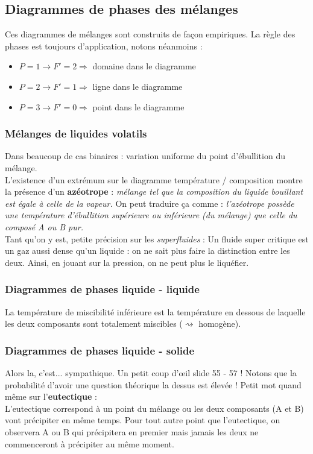 \documentclass[12pt, a4paper]{article}
\begin{document}
\subsection{Diagrammes de phases des mélanges}
Ces diagrammes de mélanges sont construits de façon empiriques. La règle des phases est toujours d'application, notons néanmoins : 
\begin{itemize}
\item $P = 1 \rightarrow F' = 2 \Rightarrow$ domaine dans le diagramme
\item $P = 2 \rightarrow F' = 1 \Rightarrow$ ligne dans le diagramme
\item $P = 3 \rightarrow F' = 0 \Rightarrow$ point dans le diagramme
\end{itemize}
\subsubsection{Mélanges de liquides volatils}
Dans beaucoup de cas binaires : variation uniforme du point d'ébullition du mélange.\\
L'existence d'un extrémum sur le diagramme température / composition montre la présence d'un \textbf{azéotrope} : \textit{mélange tel que la composition du liquide bouillant est égale à celle de la vapeur.} On peut traduire ça comme : \textit{l'azéotrope possède une température d'ébullition supérieure ou inférieure (du mélange) que celle du composé A ou B pur.}\\

Tant qu'on y est, petite précision sur les \textit{superfluides} : Un fluide super critique est un gaz aussi dense qu'un liquide : on ne sait plus faire la distinction entre les deux. Ainsi, en jouant sur la pression, on ne peut plus le liquéfier.

\subsubsection{Diagrammes de phases liquide - liquide}
La température de miscibilité inférieure est la température en dessous de laquelle les deux composants sont totalement miscibles ($\rightsquigarrow$ homogène).

\subsubsection{Diagrammes de phases liquide - solide}
Alors la, c'est... sympathique. Un petit coup d'œil slide 55 - 57 ! Notons que la probabilité d'avoir une question théorique la dessus est élevée ! Petit mot quand même sur l'\textbf{eutectique} :\\
L'eutectique correspond à un point du mélange ou les deux composants (A et B) vont précipiter en même temps. Pour tout autre point que l'eutectique, on observera A ou B qui précipitera en premier mais jamais les deux ne commenceront à précipiter au même moment.
\end{document}
